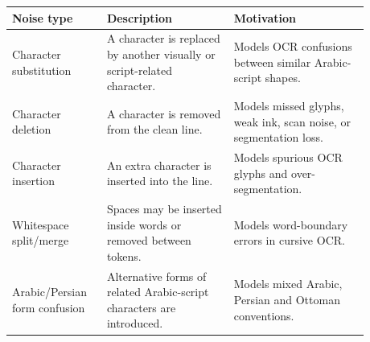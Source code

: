 \begin{tabular}{p{0.22\linewidth}p{0.32\linewidth}p{0.34\linewidth}}
\toprule
Noise type & Description & Motivation \\
\midrule
Character substitution & A character is replaced by another visually or script-related character. & Models OCR confusions between similar Arabic-script shapes. \\
Character deletion & A character is removed from the clean line. & Models missed glyphs, weak ink, scan noise, or segmentation loss. \\
Character insertion & An extra character is inserted into the line. & Models spurious OCR glyphs and over-segmentation. \\
Whitespace split/merge & Spaces may be inserted inside words or removed between tokens. & Models word-boundary errors in cursive OCR. \\
Arabic/Persian form confusion & Alternative forms of related Arabic-script characters are introduced. & Models mixed Arabic, Persian and Ottoman conventions. \\
\bottomrule
\end{tabular}
